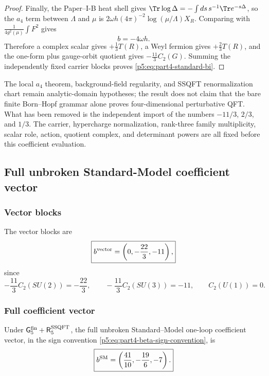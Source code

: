 \documentclass[12pt,a4paper]{article}
\begin{document}
\begin{proof}
Finally, the Paper--I-B heat shell gives
$\Tr\log\Delta=-\int ds\,s^{-1}\Tr e^{-s\Delta}$, so the $a_4$ term between
$\Lambda$ and $\mu$ is
$2\omega h(4\pi)^{-2}\log(\mu/\Lambda)X_R$.  Comparing with
$\frac1{4g^2(\mu)}\int F^2$ gives
\begin{equation}
\label{p5:eq:v2140-master-b-weight}
 \boxed{b=-4\omega h.}
\end{equation}
Therefore a complex scalar gives $+\frac13T(R)$, a Weyl fermion gives
$+\frac23T(R)$, and the one-form plus gauge-orbit quotient gives
$-\frac{11}{3}C_2(G)$.  Summing the independently fixed carrier blocks proves
\eqref{p5:eq:part4-standard-bi}.
\end{proof}

\begin{remark}
The local $a_4$ theorem, background-field regularity, and SSQFT
renormalization chart remain analytic-domain hypotheses; the result does not
claim that the bare finite Born--Hopf grammar alone proves four-dimensional
perturbative QFT.  What has been removed is the independent import of the
numbers $-11/3$, $2/3$, and $1/3$.  The carrier, hypercharge normalization,
rank-three family multiplicity, scalar role, action, quotient complex, and
determinant powers are all fixed before this coefficient evaluation.
\end{remark}

\subsection{Full unbroken Standard-Model coefficient vector}
\label{p5:sec:part4-full-sm-vector}

\subsubsection{Vector blocks}
The vector blocks are
\begin{equation}
\label{p5:eq:part4-vector-blocks}
\boxed{b^{\rm vector}=\left(0,-\frac{22}{3},-11\right),}
\end{equation}
since
\[
-\frac{11}{3}C_2(SU(2))=-\frac{22}{3},\qquad -\frac{11}{3}C_2(SU(3))=-11,\qquad C_2(U(1))=0.
\]

\subsubsection{Full coefficient vector}
\begin{proposition}
\label{p5:prop:part4-sm-vector}
Under
\(\mathsf G_5^{\rm fin}
+\mathsf R_5^{\rm SSQFT}\), the full unbroken Standard--Model one-loop
coefficient vector, in the sign convention
\eqref{p5:eq:part4-beta-sign-convention}, is
\begin{equation}
\label{p5:eq:part4-sm-vector}
\boxed{b^{\rm SM}=\left(\frac{41}{10},-\frac{19}{6},-7\right).}
\end{equation}
\end{proposition}
\end{document}
